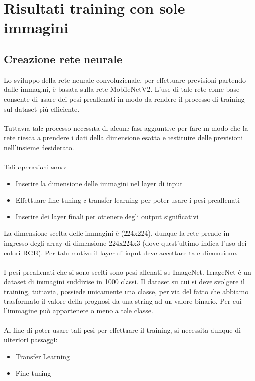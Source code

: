 \chapter{Risultati training con sole immagini}
\label{ch:CNN}
\section{Creazione rete neurale}
Lo sviluppo della rete neurale convoluzionale, per effettuare previsioni partendo dalle immagini, è basata sulla rete 
MobileNetV2. L'uso di tale rete come base consente di usare dei pesi preallenati in modo da rendere il processo di training sul dataset più efficiente.
\\\\
Tuttavia tale processo necessita di alcune fasi aggiuntive per fare in modo che la rete riesca a prendere i dati della dimensione esatta 
e restituire delle previsioni nell'insieme desiderato.
\\\\
Tali operazioni sono:
\begin{itemize}
    \item Inserire la dimensione delle immagini nel layer di input
    \item Effettuare fine tuning e transfer learning per poter usare i pesi preallenati 
    \item Inserire dei layer finali per ottenere degli output significativi
\end{itemize}

La dimensione scelta delle immagini è (224x224), dunque la rete prende in ingresso degli array di dimensione 224x224x3 (dove quest'ultimo indica l'uso dei colori RGB).
Per tale motivo il layer di input deve accettare tale dimensione.
\\\\
I pesi preallenati che si sono scelti sono pesi allenati su ImageNet. ImageNet è un dataset di immagini suddivise in 1000 classi. Il dataset su cui si deve svolgere il training, tuttavia, possiede 
unicamente una classe, per via del fatto che abbiamo trasformato il valore della prognosi da una string ad un valore binario. 
Per cui l'immagine può appartenere o meno a tale classe.
\\\\
Al fine di poter usare tali pesi per effettuare il training, si necessita dunque di ulteriori passaggi: 
\begin{itemize}
    \item Transfer Learning
    \item Fine tuning
\end{itemize}

